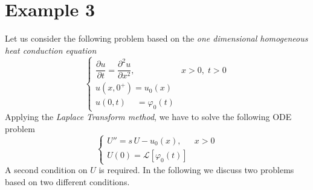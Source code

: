 \documentclass[a4paper,10pt]{report}%
\begin{document}
\section{Example 3}\label{SECT:EX3}
Let us consider the following problem based on the {\em one dimensional homogeneous heat conduction equation}%
\begin{equation}\label{EX3}
\left\{\begin{array}{ll}
\dfrac{\partial u}{\partial t} = \dfrac{\partial^2 u}{\partial x^2}, & x>0,\;t>0 \\[8pt]
u(x,0^+)          = u_0(x) \\
u(0,t)\phantom{+} = \varphi_0(t)
\end{array}\right.
\end{equation}
Applying the {\em Laplace Transform method}, we have to solve the following ODE problem
\begin{equation}\label{EX3:ODE}
\left\{
\begin{array}{ll}
U'' = s\,U - u_0(x),               & x>0 \\
U(0) = {\mathscr L}[\varphi_0(t)]
\end{array}
\right.
\end{equation}
A second condition on $U$ is required. In the following we discuss two problems based on two different conditions. 


\end{document}
